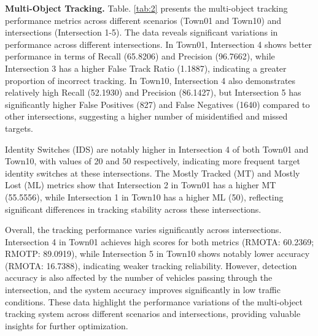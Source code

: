 \documentclass[lettersize,journal]{IEEEtran}
\begin{document}
\textbf{Multi-Object Tracking.}
Table. \ref{tab:2} presents the multi-object tracking performance metrics across different scenarios (Town01 and Town10) and intersections (Intersection 1-5). 
The data reveals significant variations in performance across different intersections. 
In Town01, Intersection 4 shows better performance in terms of Recall (65.8206) and Precision (96.7662), while Intersection 3 has a higher False Track Ratio (1.1887), indicating a greater proportion of incorrect tracking. 
In Town10, Intersection 4 also demonstrates relatively high Recall (52.1930) and Precision (86.1427), but Intersection 5 has significantly higher False Positives (827) and False Negatives (1640) compared to other intersections, suggesting a higher number of misidentified and missed targets.

Identity Switches (IDS) are notably higher in Intersection 4 of both Town01 and Town10, with values of 20 and 50 respectively, indicating more frequent target identity switches at these intersections. 
The Mostly Tracked (MT) and Mostly Lost (ML) metrics show that Intersection 2 in Town01 has a higher MT (55.5556), while Intersection 1 in Town10 has a higher ML (50), reflecting significant differences in tracking stability across these intersections.

Overall, the tracking performance varies significantly across intersections. Intersection 4 in Town01 achieves high scores for both metrics (RMOTA: 60.2369; RMOTP: 89.0919), while Intersection 5 in Town10 shows notably lower accuracy (RMOTA: 16.7388), indicating weaker tracking reliability.
However, detection accuracy is also affected by the number of vehicles passing through the intersection, and the system accuracy improves significantly in low traffic conditions.
These data highlight the performance variations of the multi-object tracking system across different scenarios and intersections, providing valuable insights for further optimization.
\end{document}
